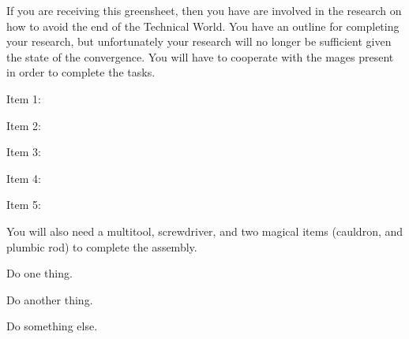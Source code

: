 \documentclass[green]{guildcamp3}
\begin{document}
\name{\gSaveTheWorldScientists{}}






If you are receiving this greensheet, then you have are involved in the research on how to avoid the end of the Technical World. You have an outline for completing your research, but unfortunately your research will no longer be sufficient given the state of the convergence. You will have to cooperate with the mages present in order to complete the tasks. 

Item 1:

Item 2:

Item 3:

Item 4:

Item 5: 

You will also need a multitool, screwdriver, and two magical items (cauldron, and plumbic rod) to complete the assembly. 

\begin{enum}[Directions]
  \item Do one thing.
  \item Do another thing.
  \item Do something else.
\end{enum}
\end{document}

